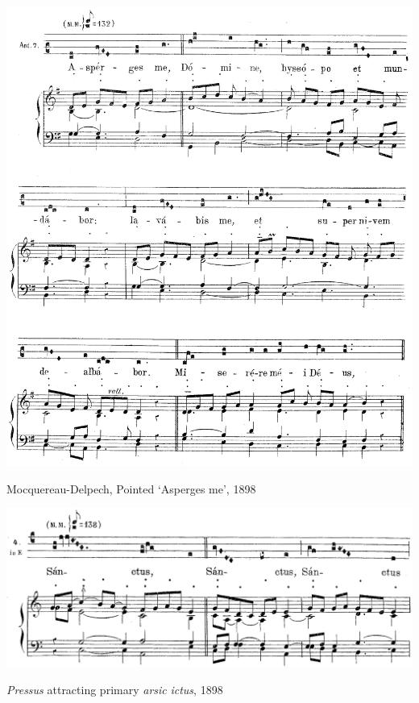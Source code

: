 \vspace*{\fill}

\begin{example}
  \centering
  \includegraphics[width=\linewidth]{c/3/ex/delpech_asperges_1.jpg}
  \caption{Mocquereau-Delpech, Pointed `Asperges me', 1898}
  \label{mus:delpech_asperges_1}
\end{example}

\vspace*{\fill}

\newpage

\vspace*{\fill}

\begin{example}
  \centering
  \includegraphics[width=\linewidth]{c/3/ex/delpech_caret_47.png}
  \caption{\emph{Pressus} attracting primary \emph{arsic} \emph{ictus}, 1898}
  \label{mus:delpech_caret_47}
\end{example}


